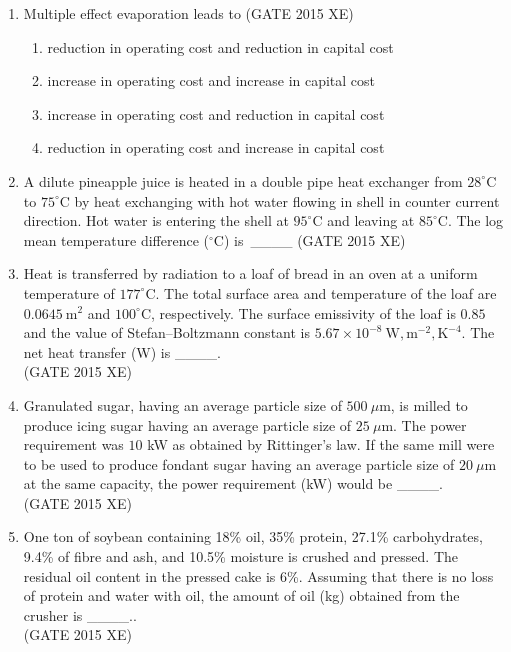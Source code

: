 \documentclass[journal,12pt,onecolumn]{IEEEtran}
\begin{document}
\begin{enumerate}
\item Multiple effect evaporation leads to
\hfill{(GATE 2015 XE)} \\
\begin{multicols}{2}
\begin{enumerate}
\item reduction in operating cost and reduction in capital cost
\item increase in operating cost and increase in capital cost
\item increase in operating cost and reduction in capital cost
\item reduction in operating cost and increase in capital cost
\end{enumerate}
\end{multicols}

\item A dilute pineapple juice is heated in a double pipe heat exchanger from $28^\circ$C to $75^\circ$C by heat exchanging with hot water flowing in shell in counter current direction. Hot water is entering the shell at $95^\circ$C and leaving at $85^\circ$C. The log mean temperature difference ($^\circ$C) is\ \_\_\_\_
\hfill{(GATE 2015 XE)} \\


\item Heat is transferred by radiation to a loaf of bread in an oven at a uniform temperature of $177^\circ$C. The total surface area and temperature of the loaf are $0.0645\ \mathrm{m^2}$ and $100^\circ$C, respectively. The surface emissivity of the loaf is $0.85$ and the value of Stefan–Boltzmann constant is $5.67\times 10^{-8}\ \mathrm{W,m^{-2},K^{-4}}$. The net heat transfer (W) is \_\_\_\_.\\
\hfill{(GATE 2015 XE)} 


\item Granulated sugar, having an average particle size of $500\ \mu$m, is milled to produce icing sugar having an average particle size of $25\ \mu$m. The power requirement was $10$ kW as obtained by Rittinger’s law. If the same mill were to be used to produce fondant sugar having an average particle size of $20\ \mu$m at the same capacity, the power requirement (kW) would be \_\_\_\_.\\
\hfill{(GATE 2015 XE)} 

\item One ton of soybean containing 18\% oil, 35\% protein, 27.1\% carbohydrates, 9.4\% of fibre and ash, and 10.5\% moisture is crushed and pressed. The residual oil content in the pressed cake is 6\%. Assuming that there is no loss of protein and water with oil, the amount of oil (kg) obtained from the crusher is \_\_\_\_.. \\
\hfill{(GATE 2015 XE)} \\



\end{enumerate}
\end{document}
